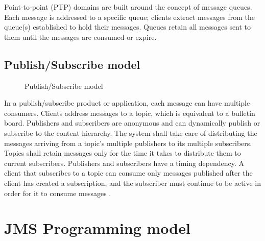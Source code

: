 \documentclass[9pt,twocolumn,twoside]{styles/osajnl}
\begin{document}
Point-to-point (PTP) domains are built around the concept of message
queues.  Each message is addressed to a specific queue; clients
extract messages from the queue(s) established to hold their
messages. Queues retain all messages sent to them until the messages
are consumed or expire.

\subsection{Publish/Subscribe model}

\begin{figure}[htbp]
\centering
{}
\caption{\cite{www-jms-tutorialoracle} Publish/Subscribe model}
\label{fig: Publish/Subscribe messaging}
\end{figure}

In a publish/subscribe product or application, each message can have
multiple consumers. Clients address messages to a topic, which is
equivalent to a bulletin board. Publishers and subscribers are
anonymous and can dynamically publish or subscribe to the content
hierarchy. The system shall take care of distributing the messages
arriving from a topic’s multiple publishers to its multiple
subscribers. Topics shall retain messages only for the time it takes
to distribute them to current subscribers.  Publishers and subscribers
have a timing dependency. A client that subscribes to a topic can
consume only messages published after the client has created a
subscription, and the subscriber must continue to be active in order
for it to consume messages \cite{www-jms-tutorialoracle}.


\section{JMS Programming model}
\end{document}

